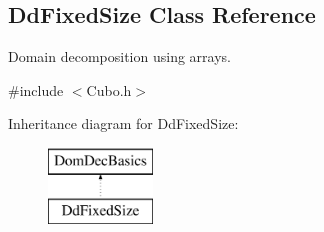 \hypertarget{classDdFixedSize}{}\subsection{Dd\+Fixed\+Size Class Reference}
\label{classDdFixedSize}


Domain decomposition using arrays.  




{\ttfamily \#include $<$Cubo.\+h$>$}

Inheritance diagram for Dd\+Fixed\+Size\+:\begin{figure}[H]
\begin{center}
\leavevmode
\includegraphics[height=2.000000cm]{classDdFixedSize}
\end{center}
\end{figure}
